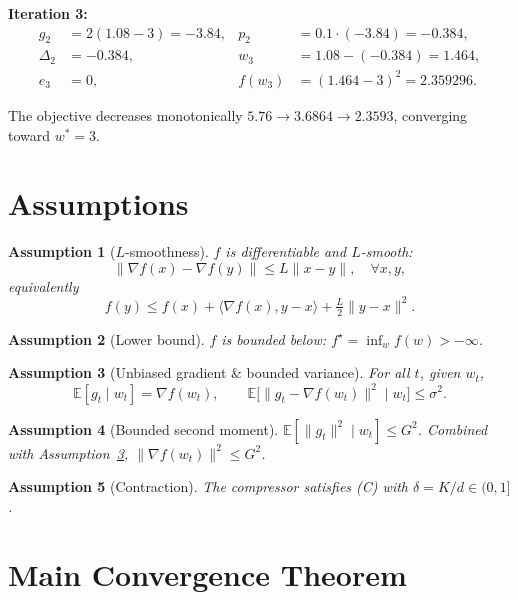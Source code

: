\documentclass[11pt]{article}
\theoremstyle{plain}
\newtheorem{assumption}{Assumption}
\begin{document}
\noindent\textbf{Iteration 3:}
\begin{align*}
g_2 &= 2(1.08-3) = -3.84, &
p_2 &= 0.1\cdot(-3.84) = -0.384,\\
\Delta_2 &= -0.384, &
w_3 &= 1.08 - (-0.384) = 1.464,\\
e_3 &= 0, &
f(w_3) &= (1.464-3)^2 = 2.359296 .
\end{align*}

\noindent The objective decreases monotonically $5.76 \to 3.6864 \to 2.3593$, converging toward $w^*=3$.

\section*{Assumptions}

\begin{assumption}[$L$-smoothness]\label{as:smooth}
$f$ is differentiable and $L$-smooth:
\[
\|\nabla f(x)-\nabla f(y)\|\le L\|x-y\|,\quad\forall x,y,
\]
equivalently
\[
f(y)\le f(x)+\langle\nabla f(x),y-x\rangle+\tfrac{L}{2}\|y-x\|^2 .
\]
\end{assumption}

\begin{assumption}[Lower bound]\label{as:lb}
$f$ is bounded below: $f^\star=\inf_w f(w)>-\infty$.
\end{assumption}

\begin{assumption}[Unbiased gradient \& bounded variance]\label{as:var}
For all $t$, given $w_t$,
\[
\mathbb{E}[g_t\mid w_t]=\nabla f(w_t),\qquad
\mathbb{E}\big[\|g_t-\nabla f(w_t)\|^2\mid w_t\big]\le\sigma^2 .
\]
\end{assumption}

\begin{assumption}[Bounded second moment]\label{as:G}
$\mathbb{E}[\|g_t\|^2\mid w_t]\le G^2$. Combined with Assumption~\ref{as:var}, $\|\nabla f(w_t)\|^2\le G^2$.
\end{assumption}

\begin{assumption}[Contraction]\label{as:contr}
The compressor satisfies (C) with $\delta=K/d\in(0,1]$.
\end{assumption}

\section*{Main Convergence Theorem}
\end{document}
